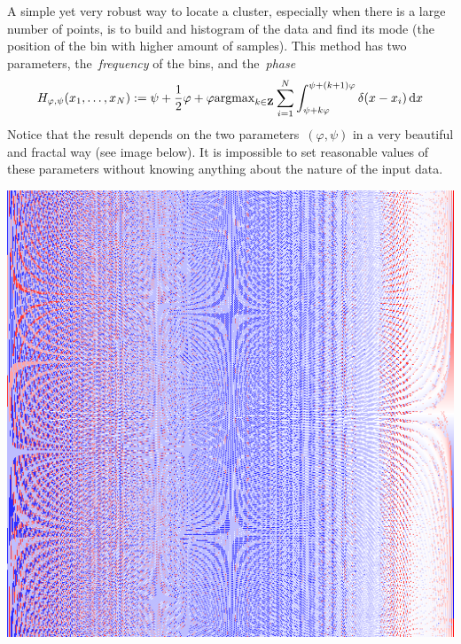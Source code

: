 A simple yet very robust way to locate a cluster, especially when
there is a large number of points, is to build and histogram of the
data and find its mode (the position of the bin with higher amount of
samples).  This method has two parameters, the~\emph{frequency} of the bins,
and the~\emph{phase}
\[
	H_{\varphi,\psi}(x_1,\ldots,x_N) :=
	\psi+\frac{1}{2}\varphi+\varphi\mathrm{argmax}_{k\in\mathbf{Z}}
	\sum_{i=1}^N\int_{\psi+k\varphi}^{\psi+(k+1)\varphi}
	\delta(x-x_i)\,\mathrm{d}x
\]
Notice
that the result depends on the two parameters~$(\varphi,\psi)$ in a
very beautiful and fractal way (see image below).
It is impossible to set reasonable values of these parameters without
knowing anything about the nature of the input data.

\includegraphics{i/modefractal.png}



